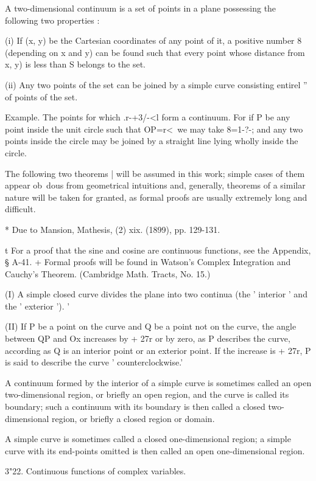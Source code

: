 A two-dimensional continuum is a set of points in a plane possessing
the following two properties :

(i) If (x, y) be the Cartesian coordinates of any point of it, a
positive number 8 (depending on x and y) can be found such that every
point whose distance from x, y) is less than S belongs to the set.

(ii) Any two points of the set can be joined by a simple curve
consisting entirel '' of points of the set.

Example. The points for which .r-+3/-<l form a continuum. For if P be
any point inside the unit circle such that OP=r<\, we may take 8=1-?-;
and any two points inside the circle may be joined by a straight line
lying wholly inside the circle.

The following two theorems | will be assumed in this work; simple
cases of them appear ob\ dous from geometrical intuitions and,
generally, theorems of a similar nature will be taken for granted, as
formal proofs are usually extremely long and difficult.

* Due to Mansion, Mathesis, (2) xix. (1899), pp. 129-131.

t For a proof that the sine and cosine are continuous functions, see
the Appendix, § A-41. + Formal proofs will be found in Watson's
Complex Integration and Cauchy's Theorem. (Cambridge Math. Tracts, No.
15.)

%
%

(I) A simple closed curve divides the plane into two continua (the '
interior ' and the ' exterior '). '

(II) If P be a point on the curve and Q be a point not on the curve,
the angle between QP and Ox increases by + 27r or by zero, as P
describes the curve, according as Q is an interior point or an
exterior point. If the increase is + 27r, P is said to describe the
curve ' counterclockwise.'

A continuum formed by the interior of a simple curve is sometimes
called an open two-dimensional region, or briefly an open region, and
the curve is called its boundary; such a continuum with its boundary
is then called a closed two-dimensional region, or briefly a closed
region or domain.

A simple curve is sometimes called a closed one-dimensional region; a
simple curve with its end-points omitted is then called an open
one-dimensional region.

3"22. Continuous functions of complex variables.

